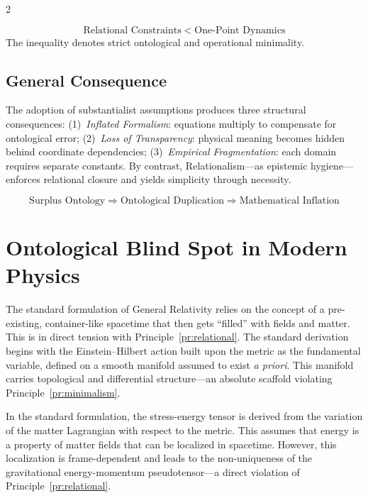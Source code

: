 \documentclass[10pt, a4paper]{article}
\begin{document}
\begin{multicols}{2}
\begin{tcolorbox}[colback=gray!5, colframe=black!80!black, title=Minimality Result]
\[
\boxed{
\text{Relational Constraints}
\;<\;
\text{One-Point Dynamics}
}
\]
The inequality denotes strict ontological and operational minimality.
\end{tcolorbox}


\subsection{General Consequence}
\hypertarget{sec:general_consequence}{}\label{sec:general_consequence}

The adoption of substantialist assumptions produces three structural consequences: (1)~\textit{Inflated Formalism}: equations multiply to compensate for ontological error; (2)~\textit{Loss of Transparency}: physical meaning becomes hidden behind coordinate dependencies; (3)~\textit{Empirical Fragmentation}: each domain requires separate constants. By contrast, Relationalism---as epistemic hygiene---enforces relational closure and yields simplicity through necessity.

\[
\boxed{\text{Surplus Ontology}} \Longrightarrow
\boxed{\text{Ontological Duplication}} \Longrightarrow
\boxed{\text{Mathematical Inflation}}
\]



\section{Ontological Blind Spot in Modern Physics}

The standard formulation of General Relativity relies on the concept of a pre-existing, container-like spacetime that then gets ``filled'' with fields and matter. This is in direct tension with Principle~\ref{pr:relational}. The standard derivation begins with the Einstein--Hilbert action built upon the metric as the fundamental variable, defined on a smooth manifold assumed to exist \textit{a priori}. This manifold carries topological and differential structure---an absolute scaffold violating Principle~\ref{pr:minimalism}.

In the standard formulation, the stress-energy tensor is derived from the variation of the matter Lagrangian with respect to the metric. This assumes that energy is a property of matter fields that can be localized in spacetime. However, this localization is frame-dependent and leads to the non-uniqueness of the gravitational energy-momentum pseudotensor---a direct violation of Principle~\ref{pr:relational}.


\end{multicols}
\end{document}
